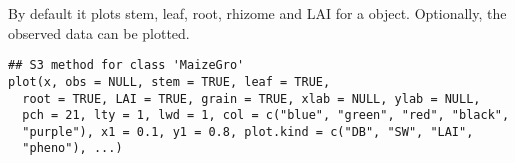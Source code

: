 \documentclass[letterpaper]{book}
\begin{document}
%
\begin{SeeAlso}\relax
{} 
\end{SeeAlso}
%
\begin{Description}\relax
By default it plots stem, leaf, root, rhizome and LAI for a
 object. Optionally, the observed data can
be plotted.
\end{Description}
%
\begin{Usage}
\begin{verbatim}
## S3 method for class 'MaizeGro'
plot(x, obs = NULL, stem = TRUE, leaf = TRUE,
  root = TRUE, LAI = TRUE, grain = TRUE, xlab = NULL, ylab = NULL,
  pch = 21, lty = 1, lwd = 1, col = c("blue", "green", "red", "black",
  "purple"), x1 = 0.1, y1 = 0.8, plot.kind = c("DB", "SW", "LAI",
  "pheno"), ...)
\end{verbatim}
\end{Usage}
%
\end{document}
